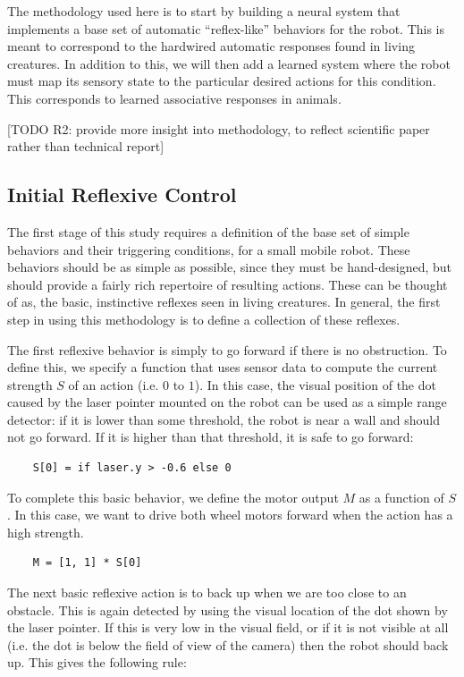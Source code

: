 \documentclass[conference]{IEEEtran}
\begin{document}
The methodology used here is to start by building a neural system that
implements a base set of automatic ``reflex-like'' behaviors for the robot.
This is meant to correspond to the hardwired automatic responses found in
living creatures.  In addition to this, we will then add a learned system
where the robot must map its sensory state to the particular desired actions
for this condition.  This corresponds to learned associative responses
in animals.

[TODO R2: provide more insight into methodology, to reflect scientific paper rather than technical report]

\subsection{Initial Reflexive Control}
The first stage of this study requires a definition of the base set of simple 
behaviors and their triggering conditions, for a small mobile robot. These 
behaviors should be as simple as possible, since they must be hand-designed, 
but should provide a fairly rich repertoire of resulting actions. These can be 
thought of as, the basic, instinctive reflexes seen in living creatures. In
general, the first step in using this methodology is to define a collection
of these reflexes.

The first reflexive behavior is simply to go forward if there is no 
obstruction. To define this, we specify a function that uses sensor data to 
compute the current strength $S$ of an action (i.e. $0$ to $1$). In this 
case, the visual position of the dot caused by the laser pointer mounted on
the robot can be used as a simple range 
detector: if it is lower than some threshold, the robot is near a wall and 
should not go forward. If it is higher than that threshold, it is safe to 
go forward: 

\begin{lstlisting}
	S[0] = if laser.y > -0.6 else 0
\end{lstlisting}

To complete this basic behavior, we define the motor output $M$ as a 
function of $S$. In this case, we want to drive both wheel motors forward 
when the action has a high strength.

\begin{lstlisting}
	M = [1, 1] * S[0]
\end{lstlisting}

The next basic reflexive action is to back up when we are too close to an 
obstacle. This is again detected by using the visual location of the dot
shown by the laser pointer.  If this is very low in the visual field, or if
it is not visible at all (i.e. the dot is below the field of view of the camera)
then the robot should back up.  This gives the following rule:
\end{document}
